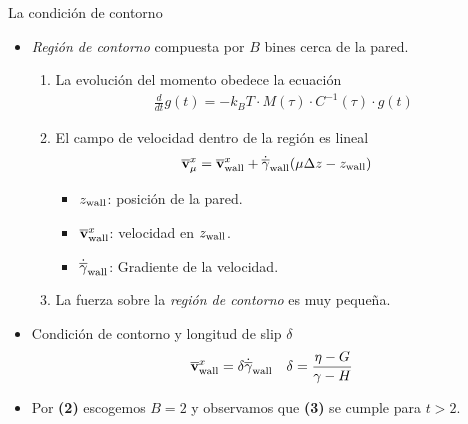 \documentclass{beamer}
\newcommand{\esc}{\!\cdot\!}
\begin{document}
\begin{frame}{La condición de contorno}
  \begin{itemize}
    \item<1-> \textit{Región de contorno} compuesta por $B$ bines cerca de la pared.
  \begin{enumerate}
    \item<2-> La evolución del momento obedece la ecuación
      \begin{align}
        \frac{d}{dt}g(t)=-k_BT\esc M(\tau)\esc C^{-1}(\tau)\esc g(t)
        \nonumber
      \end{align}
\item<3-> El campo de velocidad dentro de la región es lineal 
\begin{align}
\overline{\bf v}^x_{\mu}&=  \overline{\bf v}^x_{\rm wall}+\dot{\overline{\gamma}}_{\rm wall}(\mu\Delta z-z_{\rm wall})
\nonumber
\end{align}
      \begin{itemize}
        \item $z_{\rm wall}$: posición de la pared.
        \item $\overline{\bf v}^x_{\rm wall}$: velocidad en  $z_{\rm wall}$.
        \item $\dot{\overline{\gamma}}_{\rm wall}$: Gradiente de la velocidad.
      \end{itemize}
    \item<4-> La fuerza sobre la \textit{región de contorno} es muy pequeña. 
  \end{enumerate}
\item<5-> Condición de contorno y longitud de slip $\delta$
\begin{align}
\overline{\bf v}^x_{\rm wall}=\delta\dot{\overline{\gamma}}_{\rm wall}
  && \delta=\frac{\eta-G}{\gamma-H}
  \nonumber
\end{align}
\item<6-> Por \textbf{(2)} escogemos $B=2$ y observamos que \textbf{(3)} se cumple para $t>2$.
  \end{itemize}
\end{frame}
\end{document}
